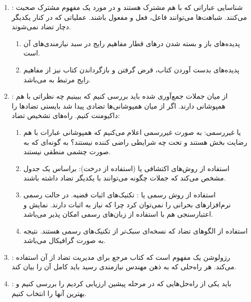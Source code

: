 \begin{enumerate}
    \item {}: شناسایی عباراتی که با هم مشترک
    هستند و در مورد یک مفهوم مشترک صحبت می‌کنند. شباهت‌ها می‌توانند فاعل، فعل و
    مفعول باشند. عملیاتی که در کنار یکدیگر دچار تضاد نمی‌شوند. \begin{enumerate}
        \item پدیده‌های باز و بسته شدن در‌های قطار مفاهیم رایج در سبد
        نیازمندی‌های آن است.
        \item پدیده‌های بدست آوردن کتاب، قرض گرفتن و بازگرداندن کتاب نیز از
        مفاهیم رایج مرتبط به  می‌باشد.
    \end{enumerate}
    \item {}: از میان جملات
    جمع‌آوری شده باید بررسی کنیم که ببینیم چه نظراتی با هم همپوشانی دارند. اگر
    از میان همپوشانی‌ها تضادی پیدا شد بایستی تضاد‌ها را داکیومنت کنیم. راه‌های
    تشخیص تضاد: \begin{enumerate}
        \item {} یا غیررسمی: به صورت غیررسمی اعلام می‌کنیم که
        همپوشانی عبارات با هم رضایت بخش هستند و تحت چه شرایطی راضی کننده نیستند؟
        به گونه‌ای که به صورت چشمی منطقی نیستند.
        \item استفاده از روش‌های اکتشافی یا  (استفاده از درخت):
        براساس یک جدول مشخص می‌کند که جملات چگونه می‌توانند با یکدیگر تضاد داشته
        باشند.
        \item استفاده از روش رسمی یا : تکنیک‌های اثبات قضیه. در
        حالت رسمی نرم‌افزار‌های بحرانی را نمی‌توان  کرد چرا که نیاز به
        اثبات دارند. نمایش و اعتبارسنجی هم با استفاده از زبان‌های رسمی امکان
        پذیر می‌باشد.
        \item استفاده از الگو‌های تضاد که نسخه‌ای سبک‌تر از تکنیک‌های رسمی
        هستند. نتیجه به صورت گرافیکال می‌باشد.
    \end{enumerate}
    \item {}: رزولوشن یک مفهوم است که کتاب مرجع
    برای مدیریت تضاد از آن استفاده می‌کند. هر  راه‌حلی که به ذهن مهندس نیازمندی
    رسید باید کامل آن را بیان کند.
    \item {}: باید یکی از راه‌حل‌هایی
    که در مرحله پیشین ارزیابی کردیم را بررسی کنیم و بهترین آنها را انتخاب کنیم.
\end{enumerate}

